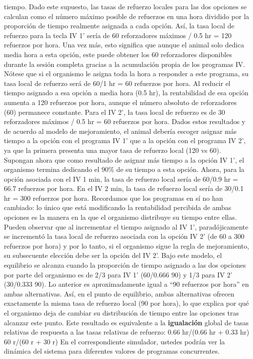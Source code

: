 \documentclass[
  letterpaper,
]{book}
\begin{document}
tiempo. Dado este supuesto, las tasas de refuerzo locales para las dos
opciones se calculan como el número máximo posible de refuerzos en una
hora dividido por la proporción de tiempo realmente asignada a cada
opción. Así, la tasa local de refuerzo para la tecla IV 1' sería de 60
reforzadores máximos / 0.5 hr = 120 refuerzos por hora. Una vez más,
esto significa que aunque el animal solo dedica media hora a esta
opción, este puede obtener los 60 reforzadores disponibles durante la
sesión completa gracias a la acumulación propia de los programas IV.
Nótese que si el organismo le asigna toda la hora a responder a este
programa, su tasa local de refuerzo será de 60/1 hr = 60 refuerzos por
hora. Al reducir el tiempo asignado a esa opción a media hora (0.5 hr),
la rentabilidad de esa opción aumenta a 120 refuerzos por hora, aunque
el número absoluto de reforzadores (60) permanece constante. Para el IV
2', la tasa local de refuerzo es de 30 reforzadores máximos / 0.5 hr =
60 refuerzos por hora. Dados estos resultados y de acuerdo al modelo de
mejoramiento, el animal debería escoger asignar más tiempo a la opción
con el programa IV 1' que a la opción con el programa IV 2', ya que la
primera presenta una mayor tasa de refuerzo local (120 vs 60). Supongan
ahora que como resultado de asignar más tiempo a la opción IV 1', el
organismo termina dedicando el 90\% de su tiempo a esta opción. Ahora,
para la opción asociada con el IV 1 min, la tasa de refuerzo local sería
de 60/0.9 hr = 66.7 refuerzos por hora. En el IV 2 min, la tasa de
refuerzo local sería de 30/0.1 hr = 300 refuerzos por hora. Recordamos
que los programas en sí no han cambiado: lo único que está modificando
la rentabilidad percibida de ambas opciones es la manera en la que el
organismo distribuye su tiempo entre ellas. Pueden observar que al
incrementar el tiempo asignado al IV 1', paradójicamente se incrementó
la tasa local de refuerzo asociada con la opción IV 2' (de 60 a 300
refuerzos por hora) y por lo tanto, si el organismo sigue la regla de
mejoramiento, su subsecuente elección debe ser la opción del IV 2'. Bajo
este modelo, el equilibrio se alcanza cuando la proporción de tiempo
asignado a las dos opciones por parte del organismo es de 2/3 para IV 1'
(60/0.666 90) y 1/3 para IV 2' (30/0.333 90). Lo anterior es
aproximadamente igual a ``90 refuerzos por hora'' en ambas alternativas.
Así, en el punto de equilibrio, ambas alternativas ofrecen exactamente
la misma tasa de refuerzo local (90 por hora), lo que explica por qué el
organismo deja de cambiar su distribución de tiempo entre las opciones
tras alcanzar este punto. Este resultado es equivalente a la
\textbf{igualación} global de tasas relativas de respuesta a las tasas
relativas de refuerzo: 0.66 hr/(0.66 hr + 0.33 hr) 60 r/(60 r + 30 r) En
el correspondiente simulador, ustedes podrán ver la dinámica del sistema
para diferentes valores de programas concurrentes.
\end{document}
